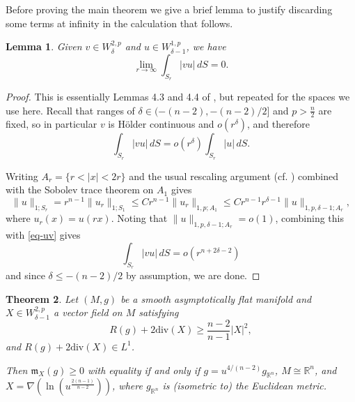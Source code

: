 \documentclass[a4paper,11pt,reqno]{amsart}
\theoremstyle{plain}
\newtheorem{thm}{Theorem}[section]
\newtheorem{lem}[thm]{Lemma}
\theoremstyle{definition}
\theoremstyle{remark}
\newcommand{\m}{\mathfrak{m}}
\numberwithin{equation}{section}
\begin{document}
Before proving the main theorem we give a brief lemma to justify discarding some terms at infinity in the calculation that follows.
\begin{lem}\label{lem-boundtrace}
	Given $v\in W^{2,p}_\delta$ and $u\in W^{1,p}_{\delta-1}$, we have 
	\begin{equation*}
		\lim_{r\to \infty} \int_{S_r} |vu|\,dS=0.
	\end{equation*}
\end{lem}
\begin{proof}
	This is essentially Lemmas 4.3 and 4.4 of \cite{Bartnik2005PhaseSpace}, but repeated for the spaces we use here. Recall that ranges of $\delta\in(-(n-2),-(n-2)/2]$ and $p>\frac{n}{2}$ are fixed, so in particular $v$ is H\"older continuous and $o(r^\delta)$, and therefore 
	\begin{equation}\label{eq-uv}
		\int_{S_r} |vu|\,dS=o(r^{\delta})\int_{S_r} |u|\,dS.
	\end{equation}
	
	
	
	Writing $A_r=\{r<|x|<2r\}$ and the usual rescaling argument (cf. \cite[Theorem 1.2]{Bartnik86}) combined with the Sobolev trace theorem on $A_1$ gives
	\begin{equation*}
		\|u\|_{1;S_r}= r^{n-1}\| u_r\|_{1;S_1} \leq C r^{n-1}\|u_r\|_{1,p;A_1}\leq C r^{n-1}r^{\delta-1}\|u\|_{1,p,\delta-1;A_r},
	\end{equation*}
	where $u_r(x)=u(rx)$. Noting that $\|u\|_{1,p,\delta-1;A_r}=o(1)$, combining this with \eqref{eq-uv} gives
	\begin{equation*}
		\int_{S_r} |vu|\,dS=o(r^{n+2\delta-2})
	\end{equation*}
	and since $\delta\leq -(n-2)/2$ by assumption, we are done.\end{proof}
\begin{thm}\label{thm-main1}
	Let $(M,g)$ be a smooth asymptotically flat manifold and $X\in W^{2,p}_{\delta-1}$ a vector field on $M$ satisfying
	\begin{equation} 
		R(g)+ 2\mathrm{div}(X)\geq\frac{n-2}{n-1}|X|^2,
	\end{equation}
	and $R(g)+ 2\mathrm{div}(X)\in L^1$.
	
	Then $\m_X(g)\geq0$ with equality if and only if $g=u^{4/(n-2)}g_{\mathbb R^n}$, $M\cong\mathbb R^n$, and $X=\nabla(\ln(u^{\frac{2(n-1)}{n-2}}))$, where $g_{\mathbb R^n}$ is (isometric to) the Euclidean metric.
\end{thm}
\end{document}
